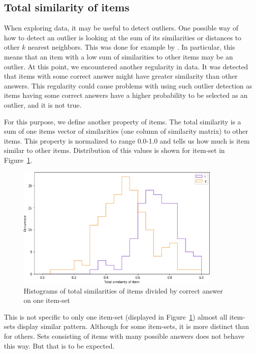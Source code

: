 \documentclass[
  printed, %
  table,   %
  nolof,     %
  nolot,     %
  color,
  final,
  nocover
]{fithesis3}
\begin{document}

\subsection{Total similarity of items}\label{total-similarity-of-items}

When exploring data, it may be useful to detect outliers. One possible way of how to detect an outlier is looking at the sum of its similarities or distances to other $k$ nearest neighbors. This was done for example by \citeauthor{zhang2006detecting}\cite{zhang2006detecting}. In particular, this means that an item with a low sum of similarities to other items may be an outlier. At this point, we encountered another regularity in data. It was detected that items with some correct answer might have greater similarity than other answers. This regularity could cause problems with using such outlier detection as items having some correct answers have a higher probability to be selected as an outlier, and it is not true.

For this purpose, we define another property of items. The total similarity is a sum of one items vector of similarities (one column of similarity matrix) to other items. This property is normalized to range 0.0-1.0 and tells us how much is item similar to other items. Distribution of this values is shown for item-set \cviceniB{} in Figure~\ref{fig:histogram_i_y}.

\begin{figure}
  \includegraphics[width=10cm]{img/histogram_i_y}
  \caption{Histograms of total similarities of items divided by correct answer on one item-set}
  \label{fig:histogram_i_y}
\end{figure}



This is not specific to only one item-set (displayed in Figure~\ref{fig:histogram_i_y}) almost all item-sets display similar pattern. Although for some item-sets, it is more distinct than for others. Sets consisting of items with many possible answers does not behave this way. But that is to be expected.
\end{document}
